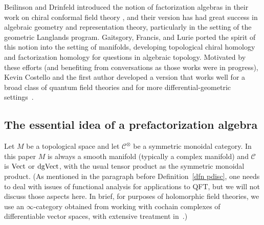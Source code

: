 \documentclass[11pt]{amsart}
\def\mc{\mathcal}
\begin{document}
\begin{rmk}
Beilinson and Drinfeld introduced the notion of factorization algebras in their work on chiral conformal field theory \cite{BD},
and their version has had great success in algebraic geometry and representation theory,
particularly in the setting of the geometric Langlands program.
Gaitsgory, Francis, and Lurie ported the spirit of this notion into the setting of  manifolds,
developing topological chiral homology \cite{LurieHA} and factorization homology \cite{AF}
for questions in algebraic topology.
Motivated by these efforts (and benefiting from conversations as those works were in progress), 
Kevin Costello and the first author developed a version that works well for a broad class of quantum field theories and for more differential-geometric settings~\cite{CG1,CG2}.
\end{rmk}

\subsection{The essential idea of a prefactorization algebra}

Let $M$ be a topological space and let $\mc{C}^\otimes$ be a symmetric monoidal category. 
In this paper $M$ is always a smooth manifold (typically a complex manifold) and $\mc{C}$ is ${\rm Vect}$ or ${\rm dgVect}$, with the usual tensor product as the symmetric monoidal product.
(As mentioned in the paragraph before Definition~\ref{dfn pdisc}, one needs to deal with issues of functional analysis for applications to QFT, but we will not discuss those aspects here.
In brief, for purposes of holomorphic field theories, we use an $\infty$-category obtained from working with cochain complexes of differentiable vector spaces, with extensive treatment in~\cite{CG1}.)
\end{document}
